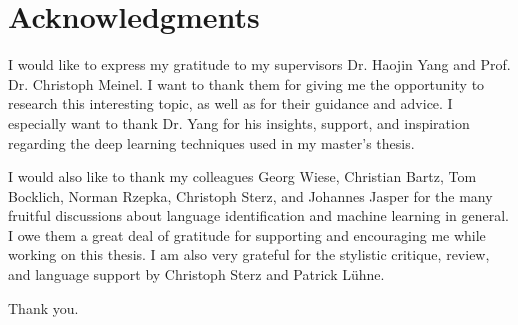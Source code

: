\section*{\LARGE Acknowledgments}
I would like to express my gratitude to my supervisors Dr. Haojin Yang and Prof. Dr. Christoph Meinel. I want to thank them for giving me the opportunity to research this interesting topic, as well as for their guidance and advice. I especially want to thank Dr. Yang for his insights, support, and inspiration regarding the deep learning techniques used in my master's thesis.

I would also like to thank my colleagues Georg Wiese, Christian Bartz, Tom Bocklich, Norman Rzepka, Christoph Sterz, and Johannes Jasper for the many fruitful discussions about language identification and machine learning in general. I owe them a great deal of gratitude for supporting and encouraging me while working on this thesis. I am also very grateful for the stylistic critique, review, and language support by Christoph Sterz and Patrick L\"uhne.

Thank you.

